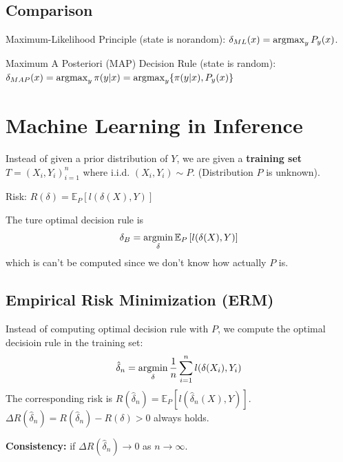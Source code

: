 \documentclass[11pt,a4paper]{article}
\newcommand{\argmax}{\operatornamewithlimits{argmax}}
\newcommand{\argmin}{\operatornamewithlimits{argmin}}
\begin{document}
\subsection{Comparison}
Maximum-Likelihood Principle (state is norandom): $\delta_{ML}(x)=\argmax_y P_y(x)$.

Maximum A Posteriori (MAP) Decision Rule (state is random): $\delta_{MAP}(x)=\argmax_y \pi(y|x)=\argmax_y \{\pi(y|x),P_y(x)\}$


\section{Machine Learning in Inference}
Instead of given a prior distribution of $Y$, we are given a \textbf{training set} $T=(X_i,Y_i)_{i=1}^n$ where i.i.d. $(X_i,Y_i)\sim P$. (Distribution $P$ is unknown).

Risk: $R(\delta)=\mathbb{E}_P\left[l(\delta(X),Y)\right]$

The ture optimal decision rule is $$\delta_B=\argmin_\delta \mathbb{E}_P\left[l(\delta(X),Y)\right]$$
which is can't be computed since we don't know how actually $P$ is.

\subsection{Empirical Risk Minimization (ERM)}
Instead of computing optimal decision rule with $P$, we compute the optimal decisioin rule in the training set:
$$\hat{\delta}_n=\argmin_\delta \frac{1}{n}\sum_{i=1}^nl(\delta(X_i),Y_i)$$
The corresponding risk is $R(\hat{\delta}_n)=\mathbb{E}_P\left[l(\hat{\delta}_n(X),Y)\right]$. $\Delta R(\hat{\delta}_n)=R(\hat{\delta}_n)- R(\delta)>0$ always holds.

\textbf{Consistency:} if $\Delta R(\hat{\delta}_n) \rightarrow 0$ as $n \rightarrow \infty$.
\end{document}
